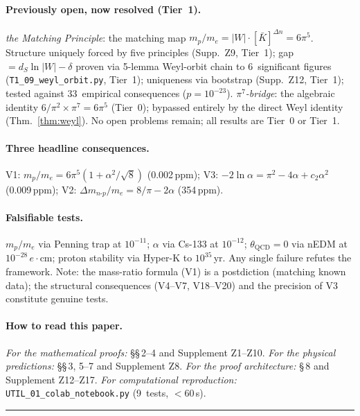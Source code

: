 \documentclass[11pt,a4paper]{article}
\theoremstyle{definition}
\theoremstyle{remark}
\begin{document}
\paragraph{Previously open, now resolved (Tier~1).}
\emph{the Matching Principle}: the matching map
$m_p/m_e=|W|\cdot[\bar K]^{\Delta n}=6\pi^5$.  Structure uniquely forced
by five principles (Supp.~Z9, Tier~1); gap $=d_S\ln|W|-\delta$ proven
via 5-lemma Weyl-orbit chain to 6~significant figures
(\texttt{T1\_09\_weyl\_orbit.py}, Tier~1);
uniqueness via bootstrap (Supp.~Z12, Tier~1);
tested against 33~empirical consequences ($p=10^{-23}$).
\emph{$\pi^7$-bridge}: the algebraic identity $6/\pi^2\times\pi^7=6\pi^5$ (Tier~0);
bypassed entirely by the direct Weyl identity (Thm.~\ref{thm:weyl}).
No open problems remain; all results are Tier~0 or Tier~1.

\paragraph{Three headline consequences.}
V1: $m_p/m_e = 6\pi^5(1+\alpha^2/\!\sqrt{8})$ (0.002\,ppm);
V3: $-2\ln\alpha = \pi^2-4\alpha+c_2\alpha^2$ (0.009\,ppm);
V2: $\Delta m_{n\mbox{-}p}/m_e = 8/\pi-2\alpha$ (354\,ppm).

\paragraph{Falsifiable tests.}
$m_p/m_e$ via Penning trap at $10^{-11}$;
$\alpha$ via Cs-133 at $10^{-12}$;
$\theta_{\mathrm{QCD}}=0$ via nEDM at $10^{-28}\,e\!\cdot\!\mathrm{cm}$;
proton stability via Hyper-K to $10^{35}\,$yr.
Any single failure refutes the framework. Note: the mass-ratio formula (V1) is a postdiction (matching known data); the structural consequences (V4--V7, V18--V20) and the precision of V3 constitute genuine tests.

\paragraph{How to read this paper.}
\emph{For the mathematical proofs:} \S\S\,2--4 and Supplement Z1--Z10.
\emph{For the physical predictions:} \S\S\,3, 5--7 and Supplement Z8.
\emph{For the proof architecture:} \S\,8 and Supplement Z12--Z17.
\emph{For computational reproduction:} \texttt{UTIL\_01\_colab\_notebook.py}
(9~tests, $<\!60\,$s).

\medskip\noindent\rule{\textwidth}{0.3pt}\medskip

\end{document}

